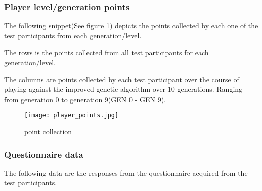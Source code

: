\subsubsection{Player level/generation points}
The following snippet(See figure \ref{fig:point_collection}) depicts the points collected by each one of the test participants from each generation/level.


The rows is the points collected from all test participants for each generation/level.

The columns are points collected by each test participant over the course of playing against the improved genetic algorithm over 10 generations. Ranging from generation 0 to generation 9(GEN 0 - GEN 9).
\begin{figure}[!htbp]
\centering
\texttt{[image: player\_points.jpg]}
\caption{point collection}
\label{fig:point_collection}
\end{figure}

\newpage
\subsubsection{Questionnaire data}
The following data are the responses from the questionnaire acquired from the test participants.

